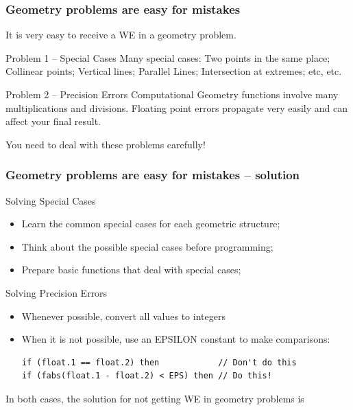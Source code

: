 \documentclass{beamer}
\begin{document}
\begin{frame}
  \frametitle{Geometry problems are easy for mistakes}

  {\smaller

    It is very easy to receive a \alert{WE} in a geometry problem.

    \bigskip
    
    \begin{block}{Problem 1 -- Special Cases}
      Many special cases: Two points in the same place; Collinear
      points; Vertical lines; Parallel Lines; Intersection at
      extremes; etc, etc.
    \end{block}

    \begin{block}{Problem 2 -- Precision Errors}
      Computational Geometry functions involve many multiplications
      and divisions. Floating point errors propagate very easily and
      can affect your final result.
    \end{block}

    \bigskip

    You need to deal with these problems carefully!
  }
\end{frame}


\begin{frame}[fragile]
  \frametitle{Geometry problems are easy for mistakes -- solution}

  {\smaller
    
    \begin{block}{Solving Special Cases}
      \begin{itemize}
      \item Learn the common special cases for each geometric structure;
      \item Think about the possible special cases before programming;
      \item Prepare basic functions that deal with special cases;
      \end{itemize}
    \end{block}
    
    \begin{block}{Solving Precision Errors}
      \begin{itemize}
      \item Whenever possible, convert all values to integers
      \item When it is not possible, use an EPSILON constant
        to make comparisons:\\
\begin{verbatim}
if (float.1 == float.2) then            // Don't do this
if (fabs(float.1 - float.2) < EPS) then // Do this!
\end{verbatim}

      \end{itemize}
    \end{block}
    
    
    In both cases, the solution for not getting \alert{WE} in geometry
    problems is 
  }
\end{frame}
\end{document}
